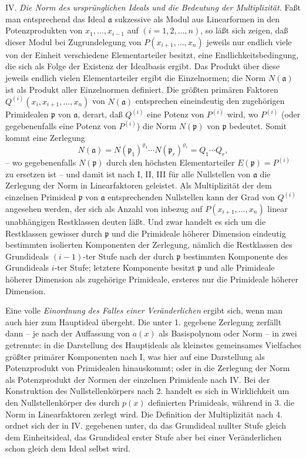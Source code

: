 \documentclass[11pt]{article}
\begin{document}
IV. \emph{Die Norm des ursprünglichen Ideals und die Bedeutung der Multiplizität.} Faßt man entsprechend das Ideal $\mathfrak a$ sukzessive als Modul aus Linearformen in den Potenzprodukten von $x_1,\ldots,x_{i-1}$ auf $(i=1,2,\ldots,n)$, so läßt sich zeigen, daß dieser Modul bei Zugrundelegung von $P(x_{i+1},\ldots,x_n)$ jeweils nur endlich viele von der Einheit verschiedene Elementarteiler besitzt, eine Endlichkeitsbedingung, die sich als Folge der Existenz der Idealbasis ergibt. Das Produkt über diese jeweils endlich vielen Elementarteiler ergibt die Einzelnormen; die Norm $N(\mathfrak a)$ ist als Produkt aller Einzelnormen definiert. Die größten primären Faktoren $Q^{(i)}(x_i,x_{i+1},\ldots,x_n)$ von $N(\mathfrak a)$ entsprechen eineindeutig den zugehörigen Primidealen $\mathfrak p$ von $\mathfrak a$, derart, daß $Q^{(i)}$ eine Potenz von $P^{(i)}$ wird, wo $P^{(i)}$ (oder gegebenenfalls eine Potenz von $P^{(i)}$) die Norm $N(\mathfrak p)$ von $\mathfrak p$ bedeutet. Somit kommt eine Zerlegung
\[
 N(\mathfrak a)=N(\mathfrak p_1)^{\varrho_1}\cdots N(\mathfrak p_r)^{\varrho_r}=Q_1\cdots Q_r,
\]
-- wo gegebenenfalls $N(\mathfrak p)$ durch den höchsten Elementarteiler $E(\mathfrak p)=P^{(i)}$ zu ersetzen ist -- und damit ist nach I, II, III für alle Nullstellen von $\mathfrak a$ die Zerlegung der Norm in Linearfaktoren geleistet. Als Multiplizität der dem einzelnen Primideal $\mathfrak p$ von $\mathfrak a$ entsprechenden Nullstellen kann der Grad von $Q^{(i)}$ angesehen werden, der sich als Anzahl von inbezug auf $P(x_{i+1},\ldots,x_n)$ linear unabhängigen Restklassen deuten läßt. Und zwar handelt es sich um die Restklassen gewisser durch $\mathfrak p$ und die Primideale höherer Dimension eindeutig bestimmten isolierten Komponenten der Zerlegung, nämlich die Restklassen des Grundideals $(i-1)$-ter Stufe nach der durch $\mathfrak p$ bestimmten Komponente des Grundideals $i$-ter Stufe; letztere Komponente besitzt $\mathfrak p$ und alle Primideale höherer Dimension als zugehörige Primideale, ersteres nur die Primideale höherer Dimension.

Eine volle \emph{Einordnung des Falles einer Veränderlichen} ergibt sich, wenn man auch hier zum Hauptideal übergeht. Die unter 1. gegebene Zerlegung zerfällt dann -- je nach der Auffassung von $a(x)$ als Basispolynom oder Norm -- in zwei getrennte: in die Darstellung des Hauptideals als kleinstes gemeinsames Vielfaches größter primärer Komponenten nach I, was hier auf eine Darstellung als Potenzprodukt von Primidealen hinauskommt; oder in die Zerlegung der Norm als Potenzprodukt der Normen der einzelnen Primideale nach IV. Bei der Konstruktion des Nullstellenkörpers nach 2. handelt es sich in Wirklichkeit um den Nullstellenkörper des durch $p(x)$ definierten Primideals, während in 3. die Norm in Linearfaktoren zerlegt wird. Die Definition der Multiplizität nach 4. ordnet sich der in IV. gegebenen unter, da das Grundideal nullter Stufe gleich dem Einheitsideal, das Grundideal erster Stufe aber bei einer Veränderlichen schon gleich dem Ideal selbst wird.
\end{document}
